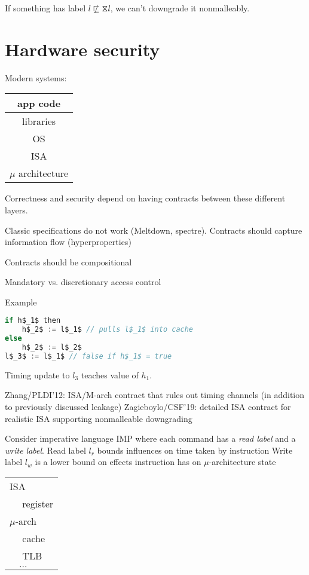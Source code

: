 \documentclass{article}
\newcommand{\refl}{\hourglass}
\begin{document}
If something has label $l \not\sqsubseteq \refl l$, we can't downgrade it nonmalleably.

\section{Hardware security}
Modern systems:
\begin{tabular}{|c|}
\hline
app code \\
\hline
libraries \\ 
\hline
OS \\
\hline
ISA \\ 
\hline
$\mu$ architecture \\
\hline
\end{tabular}

Correctness and security depend on having contracts between these different layers. 

Classic specifications do not work (Meltdown, spectre). Contracts should capture information flow (hyperproperties)

Contracts should be compositional

Mandatory vs. discretionary access control

Example
\begin{lstlisting}[mathescape,frame=single,basicstyle=\ttfamily,language=java]
if h$_1$ then
    h$_2$ := l$_1$ // pulls l$_1$ into cache
else 
    h$_2$ := l$_2$
l$_3$ := l$_1$ // false if h$_1$ = true
\end{lstlisting}

Timing update to $l_3$ teaches value of $h_1$.

Zhang/PLDI'12: ISA/M-arch contract that rules out timing channels (in addition to previously discussed leakage)
Zagieboylo/CSF'19: detailed ISA contract for realistic ISA supporting nonmalleable downgrading

Consider imperative language IMP where each command has a \emph{read label} and a \emph{write label}.
Read label $l_r$ bounds influences on time taken by instruction
Write label $l_w$ is a lower bound on effects instruction has on $\mu$-architecture state
\begin{tabular}{|l|}
\hline
ISA \\
$\quad$ register \\
\hline
$\mu$-arch \\
$\quad$ cache \\
$\quad$ TLB \\
$\quad \ldots$ \\
\hline
\end{tabular}
\end{document}

